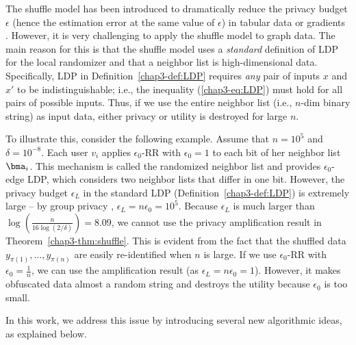 The shuffle model has been introduced to dramatically reduce the privacy budget $\epsilon$ (hence the estimation error at the same value of $\epsilon$) in tabular data \cite{Wang_PVLDB20} or 
gradients 
\cite{Girgis_AISTATS21,Liu_AAAI21}. 
However, it is very challenging to apply the shuffle model to graph data. 
The main reason for this is that 
the shuffle model uses a \textit{standard} definition of LDP for the local randomizer and that a neighbor list is high-dimensional data. 
Specifically, LDP in Definition~\ref{chap3-def:LDP} requires \textit{any} pair of inputs $x$ and $x'$ to be indistinguishable; i.e., 
the inequality (\ref{chap3-eq:LDP}) must hold for all pairs of possible inputs. 
Thus, if we use the entire neighbor list (i.e., $n$-dim binary string) as input data, 
either privacy or utility is destroyed for large $n$. 

To illustrate this, consider the following example. 
Assume that $n=10^5$ and $\delta=10^{-8}$. 
Each user $v_i$ applies 
$\epsilon_0$-RR 
with $\epsilon_0=1$ to each bit of her neighbor list $\bma_i$. 
This mechanism is called the randomized neighbor list \cite{Qin_CCS17} and provides $\epsilon_0$-edge LDP, which considers two neighbor lists that differ in one bit. 
However, the privacy budget $\epsilon_L$ in the standard LDP (Definition~\ref{chap3-def:LDP}) 
is extremely large -- by group privacy \cite{DP}, $\epsilon_L = n \epsilon_0 = 10^5$. 
Because 
$\epsilon_L$ 
is much larger than $\log (\frac{n}{16 \log (2/\delta)}) = 8.09$, we cannot use the privacy amplification result in Theorem~\ref{chap3-thm:shuffle}. 
This is evident from the fact that the shuffled data $y_{\pi(1)}, \ldots, y_{\pi(n)}$ are easily re-identified when $n$ is large. 
If we use 
$\epsilon_0$-RR 
with $\epsilon_0 = \frac{1}{n}$, we can use the amplification result (as $\epsilon_L = n \epsilon_0 = 1$). 
However, it makes obfuscated data almost a random string and destroys the utility because $\epsilon_0$ is too small. 

In this work, we address this issue by introducing several new algorithmic ideas, as explained below. 


